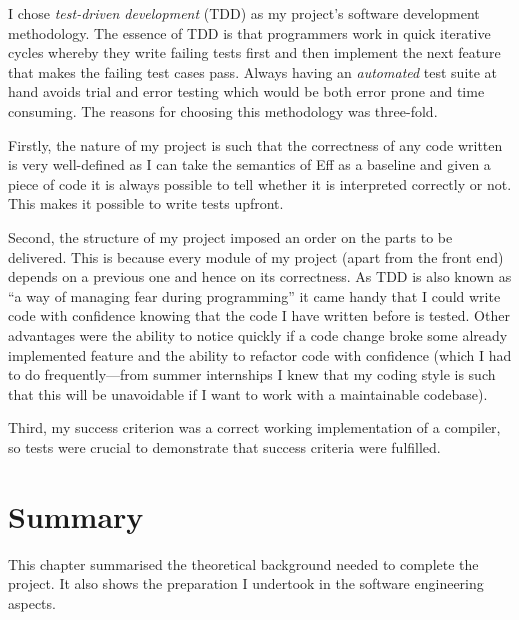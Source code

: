 \documentclass[class=article, crop=false]{standalone}
\begin{document}
I chose \emph{test-driven development} (TDD) \cite{beck2003test} as my project's
software development methodology. The essence of TDD is that programmers work in
quick iterative cycles whereby they write failing tests first and then implement
the next feature that makes the failing test cases pass. Always having an
\emph{automated} test suite at hand avoids trial and error testing which would
be both error prone and time consuming. The reasons for choosing this
methodology was three-fold.

Firstly, the nature of my project is such that the correctness of any code
written is very well-defined as I can take the semantics of Eff as a baseline
and given a piece of code it is always possible to tell whether it is
interpreted correctly or not. This makes it possible to write tests upfront.

Second, the structure of my project imposed an order on the parts to be
delivered. This is because every module of my project (apart from the front end)
depends on a previous one and hence on its correctness. As TDD is also known as 
``a way of managing fear during programming'' it came handy that I could write
code with confidence knowing that the code I have written before is tested.
Other advantages were the ability to notice quickly if a code change broke some
already implemented feature and the ability to refactor code with confidence
(which I had to do frequently---from summer internships I knew that my coding
style is such that this will be unavoidable if I want to work with a
maintainable codebase).

Third, my success criterion was a correct working implementation of a compiler,
so tests were crucial to demonstrate that success criteria were fulfilled.

\section{Summary}
This chapter summarised the theoretical background needed to complete the project.
It also shows the preparation I undertook in the software engineering aspects.
\end{document}
